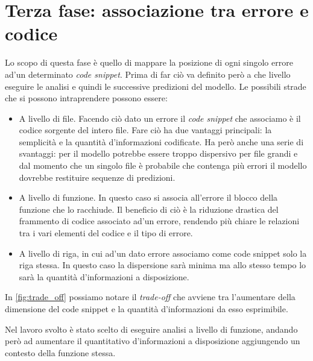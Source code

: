 \section{Terza fase: associazione tra errore e codice}
Lo scopo di questa fase è quello di mappare la posizione di ogni singolo errore ad'un determinato \textit{code snippet}. 
Prima di far ciò va definito però a che livello eseguire le analisi e quindi le successive predizioni del modello.
Le possibili strade che si possono intraprendere possono essere:
  \begin{itemize}
    \item A livello di file. Facendo ciò dato un errore il \textit{code snippet} che associamo è il codice sorgente del intero file. 
          Fare ciò ha due vantaggi principali: la semplicità e la quantità d'informazioni codificate. 
          Ha però anche una serie di svantaggi: per il modello potrebbe essere troppo dispersivo per file grandi e dal momento che un singolo file è probabile che contenga più errori il modello dovrebbe restituire sequenze di predizioni.
    \item A livello di funzione. In questo caso si associa all'errore il blocco della funzione che lo racchiude.
          Il beneficio di ciò è la riduzione drastica del frammento di codice associato ad'un errore, rendendo più chiare le relazioni tra i vari elementi del codice e il tipo di errore.
    \item A livello di riga, in cui ad'un dato errore associamo come code snippet solo la riga stessa. In questo caso la dispersione sarà minima ma allo stesso tempo lo sarà la quantità d'informazioni a disposizione.
  \end{itemize}

In \autoref{fig:trade_off} possiamo notare il \textit{trade-off} che avviene tra l'aumentare della dimensione del code snippet e la quantità d'informazioni da esso esprimibile. 

Nel lavoro svolto è stato scelto di eseguire analisi a livello di funzione, andando però ad aumentare il quantitativo d'informazioni a disposizione aggiungendo un contesto della funzione stessa.

